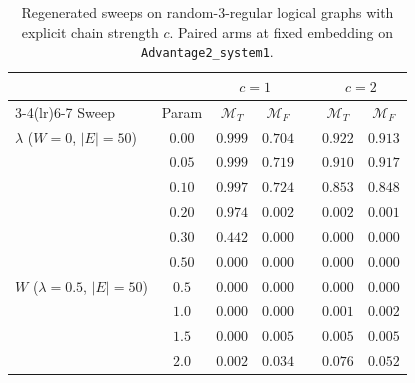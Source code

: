 \documentclass[aps,prapplied,reprint,superscriptaddress,floatfix,nofootinbib]{revtex4-2}
\begin{document}
\begin{table}[!htbp]
\centering
\caption{Regenerated sweeps on random-3-regular logical graphs with explicit chain strength $c$.  Paired arms at fixed embedding on \texttt{Advantage2\_system1}.}
\label{tab:regen_lambda_rr}
\small
\begin{tabular}{lcccccc}
\toprule
& & \multicolumn{2}{c}{$c=1$} & & \multicolumn{2}{c}{$c=2$} \\
\cmidrule(lr){3-4}\cmidrule(lr){6-7}
Sweep & Param & $\mathcal{M}_T$ & $\mathcal{M}_F$ & & $\mathcal{M}_T$ & $\mathcal{M}_F$ \\
\midrule
$\lambda$ ($W=0$, $|E|=50$) & $0.00$ & $0.999$ & $0.704$ & & $0.922$ & $0.913$ \\
                           & $0.05$ & $0.999$ & $0.719$ & & $0.910$ & $0.917$ \\
                           & $0.10$ & $0.997$ & $0.724$ & & $0.853$ & $0.848$ \\
                           & $0.20$ & $0.974$ & $0.002$ & & $0.002$ & $0.001$ \\
                           & $0.30$ & $0.442$ & $0.000$ & & $0.000$ & $0.000$ \\
                           & $0.50$ & $0.000$ & $0.000$ & & $0.000$ & $0.000$ \\
\midrule
$W$ ($\lambda=0.5$, $|E|=50$) & $0.5$ & $0.000$ & $0.000$ & & $0.000$ & $0.000$ \\
                             & $1.0$ & $0.000$ & $0.000$ & & $0.001$ & $0.002$ \\
                             & $1.5$ & $0.000$ & $0.005$ & & $0.005$ & $0.005$ \\
                             & $2.0$ & $0.002$ & $0.034$ & & $0.076$ & $0.052$ \\
\bottomrule
\end{tabular}
\end{table}
\end{document}
